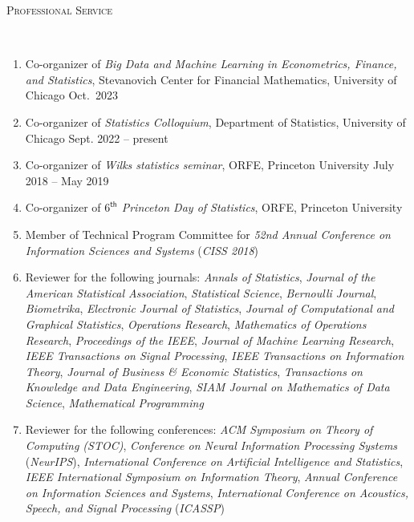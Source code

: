 \documentclass[a4paper, 10pt]{article}
\newenvironment{changemargin}[2]{%
  \begin{list}{}{%
    \setlength{\topsep}{0pt}%
    \setlength{\leftmargin}{#1}%
    \setlength{\rightmargin}{#2}%
    \setlength{\listparindent}{\parindent}%
    \setlength{\itemindent}{\parindent}%
    \setlength{\parsep}{\parskip}%
  }%
  \item[]}{\end{list}
}
\newcommand{\lineover}{
	\begin{changemargin}{-0.05in}{-0.05in}
		\vspace*{-8pt}
		\hrulefill \\
		\vspace*{-2pt}
	\end{changemargin}
}
\newcommand{\header}[1]{
	\begin{changemargin}{-0.5in}{-0.5in}
		\scshape{#1}\\
  	\lineover
	\end{changemargin}
}
\newenvironment{body} {
	\vspace*{-16pt}
	\begin{changemargin}{-0.3in}{-0.5in}
  }	
	{\end{changemargin}
}
\begin{document}
%
\bigskip
\header{\LARGE{Professional Service}}
\begin{body}
	\vspace{18pt}
	\begin{enumerate}
	\item Co-organizer of \emph{Big Data and Machine Learning in Econometrics, Finance, and Statistics}, Stevanovich Center for Financial Mathematics, University of Chicago \hfill Oct.~2023
	\item Co-organizer of \emph{Statistics Colloquium}, Department of Statistics, University of Chicago \hfill Sept. 2022 -- present
	\item Co-organizer of \emph{Wilks statistics seminar}, ORFE, Princeton University \hfill July 2018 -- May 2019
	\item Co-organizer of \emph{$6^{\mathsf{th}}$ Princeton Day of Statistics}, ORFE, Princeton University
	\item Member of Technical Program Committee for \emph{52nd Annual Conference on Information Sciences and Systems} (\emph{CISS 2018})
	\item Reviewer for the following journals: \emph{Annals of Statistics}, \emph{Journal of the American Statistical Association}, \emph{Statistical Science}, \emph{Bernoulli Journal}, \emph{Biometrika}, \emph{Electronic Journal of Statistics}, \emph{Journal of Computational and Graphical Statistics}, \emph{Operations Research}, \emph{Mathematics of Operations Research}, \emph{Proceedings of the IEEE}, \emph{Journal of Machine Learning Research}, \emph{IEEE Transactions on Signal Processing}, \emph{IEEE Transactions on Information Theory}, \emph{Journal of Business \& Economic Statistics}, \emph{Transactions on Knowledge and Data Engineering}, \emph{SIAM Journal on Mathematics of Data Science}, \emph{Mathematical Programming}
	\item Reviewer for the following conferences: \emph{ACM Symposium on Theory of Computing (STOC)}, \emph{Conference on Neural Information Processing Systems} (\emph{NeurIPS}), \emph{International Conference on Artificial Intelligence and Statistics}, \emph{IEEE International Symposium on Information Theory}, \emph{Annual Conference on Information Sciences and Systems}, \emph{International Conference on Acoustics, Speech, and Signal Processing} (\emph{ICASSP})

	\end{enumerate}
\end{body}
\end{document}
